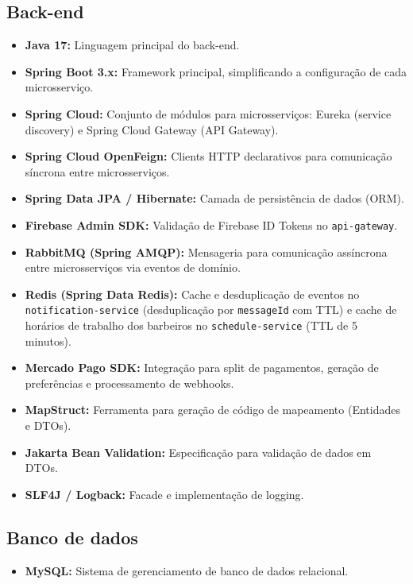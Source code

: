 \documentclass[
    12pt, 
    a4paper, 
    oneside, 
    chapter=TITLE, 
    section=TITLE
]{abntex2}
\begin{document}
\subsection{Back-end}
\begin{itemize}
    \item \textbf{Java 17:} Linguagem principal do back-end.
    \item \textbf{Spring Boot 3.x:} Framework principal, simplificando a configuração de cada microsserviço.
    \item \textbf{Spring Cloud:} Conjunto de módulos para microsserviços: Eureka (service discovery) e Spring Cloud Gateway (API Gateway).
    \item \textbf{Spring Cloud OpenFeign:} Clients HTTP declarativos para comunicação síncrona entre microsserviços.
    \item \textbf{Spring Data JPA / Hibernate:} Camada de persistência de dados (ORM).
    \item \textbf{Firebase Admin SDK:} Validação de Firebase ID Tokens no \texttt{api-gateway}.
    \item \textbf{RabbitMQ (Spring AMQP):} Mensageria para comunicação assíncrona entre microsserviços via eventos de domínio.
    \item \textbf{Redis (Spring Data Redis):} Cache e desduplicação de eventos no \texttt{notification-service} (desduplicação por \texttt{messageId} com TTL) e cache de horários de trabalho dos barbeiros no \texttt{schedule-service} (TTL de 5 minutos).
    \item \textbf{Mercado Pago SDK:} Integração para split de pagamentos, geração de preferências e processamento de webhooks.
    \item \textbf{MapStruct:} Ferramenta para geração de código de mapeamento (Entidades e DTOs).
    \item \textbf{Jakarta Bean Validation:} Especificação para validação de dados em DTOs.
    \item \textbf{SLF4J / Logback:} Facade e implementação de logging.
\end{itemize}

\subsection{Banco de dados}
\begin{itemize}
    \item \textbf{MySQL:} Sistema de gerenciamento de banco de dados relacional.
\end{itemize}
\end{document}
